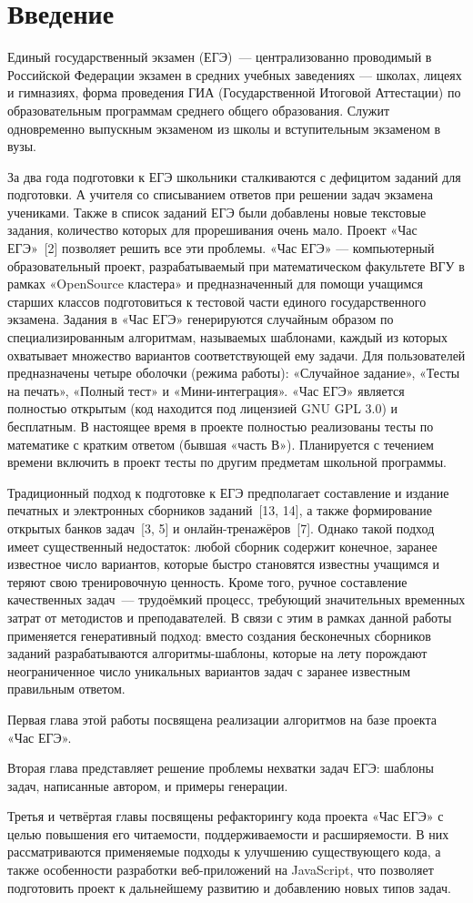 \section*{Введение}
Единый государственный экзамен (ЕГЭ)~— централизованно проводимый в Российской
Федерации экзамен в средних учебных заведениях — школах, лицеях и гимназиях,
форма проведения ГИА (Государственной Итоговой Аттестации) по образовательным программам среднего общего образования.
Служит одновременно выпускным экзаменом из школы и вступительным экзаменом в вузы.

За два года подготовки к ЕГЭ школьники сталкиваются с дефицитом заданий для подготовки. 
А учителя со списыванием ответов при решении задач экзамена учениками. 
Также в список заданий ЕГЭ были добавлены новые текстовые задания, 
количество которых для прорешивания очень мало.
Проект «Час ЕГЭ»~[2] позволяет решить все эти проблемы. «Час ЕГЭ» — компьютерный образовательный проект, 
разрабатываемый при математическом факультете ВГУ в рамках «OpenSource кластера» и предназначенный для помощи учащимся старших классов подготовиться к тестовой части единого государственного экзамена. 
Задания в «Час ЕГЭ» генерируются случайным образом по специализированным алгоритмам, называемых шаблонами, 
каждый из которых охватывает множество вариантов соответствующей ему задачи. 
Для пользователей предназначены четыре оболочки (режима работы): «Случайное задание», «Тесты на печать», «Полный тест» и «Мини-интеграция». 
«Час ЕГЭ» является полностью открытым (код находится под лицензией GNU GPL 3.0) и бесплатным. 
В настоящее время в проекте полностью реализованы тесты по математике с кратким ответом (бывшая «часть В»). 
Планируется с течением времени включить в проект тесты по другим предметам школьной программы.

Традиционный подход к подготовке к ЕГЭ предполагает составление 
и издание печатных и электронных сборников заданий~[13, 14], 
а также формирование открытых банков задач~[3, 5] 
и онлайн-тренажёров~[7]. 
Однако такой подход имеет существенный недостаток: любой сборник 
содержит конечное, заранее известное число вариантов, которые быстро 
становятся известны учащимся и теряют свою тренировочную ценность. 
Кроме того, ручное составление качественных задач~— трудоёмкий процесс, 
требующий значительных временных затрат от методистов и преподавателей. 
В связи с этим в рамках данной работы применяется генеративный подход: 
вместо создания бесконечных сборников заданий разрабатываются алгоритмы-шаблоны, 
которые на лету порождают неограниченное число уникальных вариантов задач 
с заранее известным правильным ответом. 

Первая глава этой работы посвящена реализации алгоритмов на базе проекта «Час ЕГЭ».

Вторая глава представляет решение проблемы нехватки задач ЕГЭ: шаблоны задач, написанные автором, и примеры генерации.

Третья и четвёртая главы посвящены рефакторингу кода проекта «Час ЕГЭ» с целью повышения его читаемости, поддерживаемости и расширяемости. В них рассматриваются применяемые подходы к улучшению существующего кода, а также особенности разработки веб-приложений на JavaScript, что позволяет подготовить проект к дальнейшему развитию и добавлению новых типов задач.